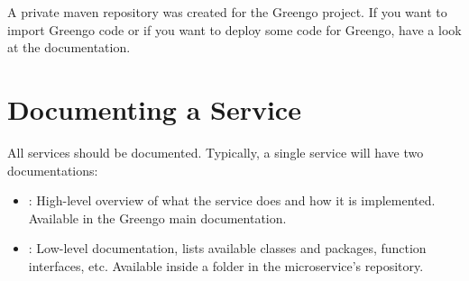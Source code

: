 \documentclass[letterpaper,10pt,english]{sphinxmanual}
\begin{document}
 

 

 

A private maven repository was created for the Greengo project.
If you want to import Greengo code or if you want to deploy some code for Greengo, have a look at the {\hyperref[\detokenize{private_maven_repo:private-maven-repo}]{}} documentation.


\section{Documenting a Service}
\label{\detokenize{building_a_microservice:documenting-a-service}}\label{\detokenize{building_a_microservice:service-documentation}}
All services should be documented.
Typically, a single service will have two documentations:
\begin{itemize}
\item {} 
: High-level overview of what the service does and how it is implemented. Available in the Greengo main documentation.

\item {} 
: Low-level documentation, lists available classes and packages, function interfaces, etc. Available inside a  folder in the microservice’s repository.

\end{itemize}
\end{document}
